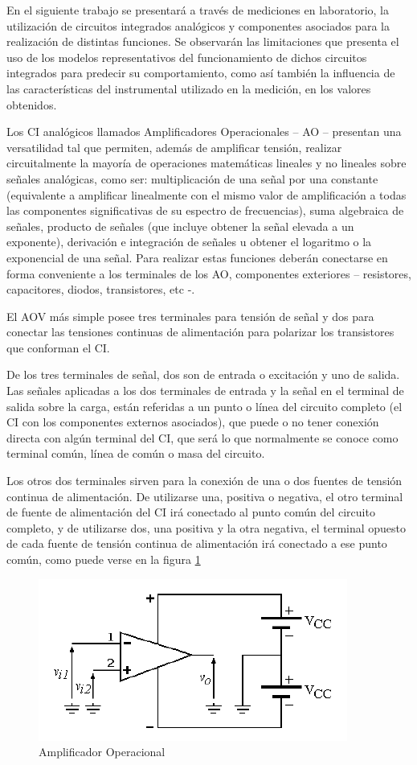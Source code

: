 \documentclass[10pt,spanish,a4paper,openany,notitlepage]{article}
\begin{document}
En el siguiente trabajo se presentará a través de mediciones en laboratorio, la utilización
de circuitos integrados analógicos y componentes asociados para la realización de distintas funciones.
Se observarán las limitaciones que presenta el uso de los modelos representativos del funcionamiento de
dichos circuitos integrados para predecir su comportamiento, como así también la influencia de las
características del instrumental utilizado en la medición, en los valores obtenidos.

Los CI analógicos llamados Amplificadores Operacionales – AO – presentan una versatilidad
tal que permiten, además de amplificar tensión, realizar circuitalmente la mayoría de operaciones matemáticas
lineales y no lineales sobre señales analógicas, como ser: multiplicación de una señal por una
constante (equivalente a amplificar linealmente con el mismo valor de amplificación a todas las componentes
significativas de su espectro de frecuencias), suma algebraica de señales, producto de señales
(que incluye obtener la señal elevada a un exponente), derivación e integración de señales u obtener el
logaritmo o la exponencial de una señal. Para realizar estas funciones deberán conectarse en forma
conveniente a los terminales de los AO, componentes exteriores – resistores, capacitores, diodos, transistores,
etc -.

El AOV más simple posee tres terminales para tensión de señal y dos para conectar las tensiones
continuas de alimentación para polarizar los transistores que conforman el CI.

De los tres terminales de señal, dos son de entrada o excitación y uno de salida. Las señales
aplicadas a los dos terminales de entrada y la señal en el terminal de salida sobre la carga, están referidas
a un punto o línea del circuito completo (el CI con los componentes externos asociados), que
puede o no tener conexión directa con algún terminal del CI, que será lo que normalmente se conoce
como terminal común, línea de común o masa del circuito.

Los otros dos terminales sirven para la conexión de una o dos fuentes de tensión continua de
alimentación. De utilizarse una, positiva o negativa, el otro terminal de fuente de alimentación del CI
irá conectado al punto común del circuito completo, y de utilizarse dos, una positiva y la otra negativa,
el terminal opuesto de cada fuente de tensión continua de alimentación irá conectado a ese punto
común, como puede verse en la figura \ref{fig:AO}

\begin{figure}[H]
\centering
\includegraphics[scale=1]{circuitos/AO.png}
\caption{Amplificador Operacional}
\label{fig:AO}
\end{figure}
\end{document}

